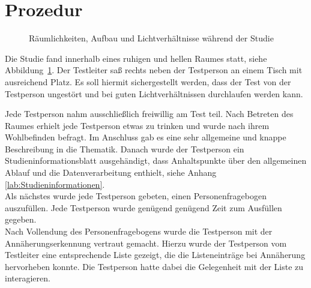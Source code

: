 \documentclass[12pt,numbers=noenddot,parskip,bibliography=totocnumbered,listof=totocnumbered]{scrreprt}
\begin{document}
\section{Prozedur}
\begin{figure}
\centering
{}
\vfill
{}
\vfill
{}
\caption{Räumlichkeiten, Aufbau und Lichtverhältnisse während der Studie}
\label{prozedurumgebung}
\end{figure}
Die Studie fand innerhalb eines ruhigen und hellen Raumes statt, siehe Abbildung~\ref{prozedurumgebung}. Der Testleiter saß rechts neben der Testperson an einem Tisch mit ausreichend Platz. Es soll hiermit sichergestellt werden, dass der Test von der Testperson ungestört und bei guten Lichtverhältnissen durchlaufen werden kann.

Jede Testperson nahm ausschließlich freiwillig am Test teil. Nach Betreten des Raumes erhielt jede Testperson etwas zu trinken und wurde nach ihrem Wohlbefinden befragt. Im Anschluss gab es eine sehr allgemeine und knappe Beschreibung in die Thematik. Danach wurde der Testperson ein Studieninformationsblatt ausgehändigt, dass Anhaltspunkte über den allgemeinen Ablauf und die Datenverarbeitung enthielt, siehe Anhang \ref{lab:Studieninformationen}.\\
Als nächstes wurde jede Testperson gebeten, einen Personenfragebogen auszufüllen. Jede Testperson wurde genügend genügend Zeit zum Ausfüllen gegeben.\\
Nach Vollendung des Personenfragebogens wurde die Testperson mit der Annäherungserkennung vertraut gemacht. Hierzu wurde der Testperson vom Testleiter eine entsprechende Liste gezeigt, die die Listeneinträge bei Annäherung hervorheben konnte. Die Testperson hatte dabei die Gelegenheit mit der Liste zu interagieren.
\end{document}
